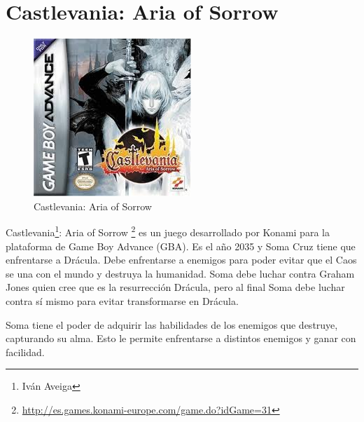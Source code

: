 \section{Castlevania: Aria of Sorrow}

\begin{figure}[htbp]
\begin{center}
\includegraphics[width=.60\textwidth]{./imagenes/castlevaniaAOS.jpg}
\caption{Castlevania: Aria of Sorrow}
\label{Zelda: Skyward Sword}
\end{center}
\end{figure}
Castlevania\footnote{Iván Aveiga}: Aria of Sorrow \footnote{\url{http://es.games.konami-europe.com/game.do?idGame=31}} es un juego desarrollado por Konami para la plataforma de Game Boy Advance (GBA). Es el año 2035 y Soma Cruz tiene que enfrentarse a Drácula. Debe enfrentarse a enemigos para poder evitar que el Caos se una con el mundo y destruya la humanidad. Soma debe luchar contra Graham Jones quien cree que es la resurrección Drácula, pero al final Soma debe luchar contra sí mismo para evitar transformarse en Drácula.

Soma tiene el poder de adquirir las habilidades de los enemigos que destruye, capturando su alma. Esto le permite enfrentarse a distintos enemigos y ganar con facilidad.

